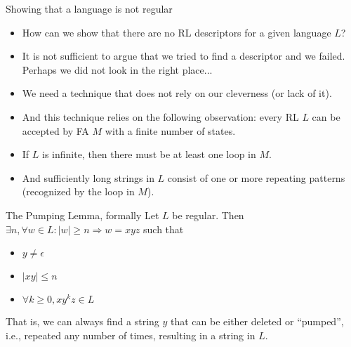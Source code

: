 \documentclass{prosper}%
\newcommand{\e} {{\mbox{$\epsilon$}}}
\begin{document}
\begin{slide}{Showing that a language is not regular}
\begin{itemize}
\item How can we show that there are no RL descriptors  for a given language $L$?
\item It is not sufficient to argue that we tried to find a descriptor and we failed. Perhaps we did not look in the right place...
\item We need a technique that does not rely on our cleverness (or lack of it).
\item And this technique relies on the following observation: every RL $L$ can be accepted by FA $M$ with a finite number of states.
\item If $L$ is infinite, then there must be at least one loop in $M$.
\item And sufficiently long strings in $L$ consist of one or more repeating patterns (recognized by the loop in $M$).
\end{itemize}
\end{slide}

\begin{slide}{The Pumping Lemma, formally}
Let $L$ be regular. Then $\exists n, \forall w \in L : |w|\geq n \Rightarrow w=xyz$ such that
\begin{itemize}
\item $y\neq \e$
\item $|xy| \leq n$
\item $\forall k\geq 0, xy^kz\in L$
\end{itemize}
That is, we can always find a string $y$ that can be either deleted or ``pumped'', i.e., repeated any number of times, resulting in a string in $L$.
\end{slide}
\end{document}
